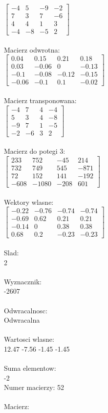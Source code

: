\documentclass[a4paper,12pt]{article}
\begin{document}
$\begin{bmatrix} -4&5&-9&-2\\7&3&7&-6\\4&4&1&3\\-4&-8&-5&2 \end{bmatrix}$
\\
\\
Macierz odwrotna:\\

$\begin{bmatrix} 0.04&0.15&0.21&0.18\\0.03&-0.06&0&-0.13\\-0.1&-0.08&-0.12&-0.15\\-0.06&-0.1&0.1&-0.02 \end{bmatrix}$
\\
\\
Macierz transponowana:\\

$\begin{bmatrix} -4&7&4&-4\\5&3&4&-8\\-9&7&1&-5\\-2&-6&3&2 \end{bmatrix}$
\\
\\
Macierz do potegi 3:\\

$\begin{bmatrix} 233&752&-45&214\\732&749&545&-871\\72&152&141&-192\\-608&-1080&-208&601 \end{bmatrix}$
\\
\\
Wektory wlasne:\\

$\begin{bmatrix} -0.22&-0.76&-0.74&-0.74\\-0.69&0.62&0.21&0.21\\-0.14&0&0.38&0.38\\0.68&0.2&-0.23&-0.23 \end{bmatrix}$
\\
\\
Slad:\\
2
\\
\\
Wyznacznik:\\
-2607
\\
\\
Odwracalnosc:\\
Odwracalna
\\
\\
Wartosci wlasne:\\
12.47 -7.56 -1.45 -1.45
\\
\\
Suma elementow:\\
-2
\\
\newpage
Numer macierzy:
52
\\
\\
Macierz:\\
\end{document}
